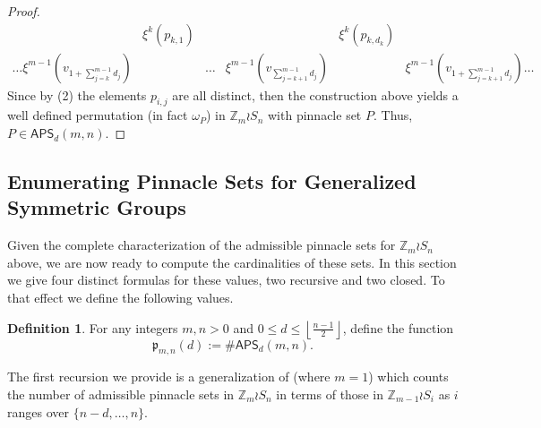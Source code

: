 \documentclass[12pt,reqno]{amsart}
\numberwithin{equation}{section}
\theoremstyle{plain}
\theoremstyle{definition}
\newtheorem{definition}[theorem]{Definition}
\theoremstyle{remark}
\newcommand{\Z}{\mathbb{Z}}
\newcommand{\p}{\mathfrak{p}}
\newcommand\APS{\mathsf{APS}}
\newcommand{\floor}[1]{\left\lfloor#1\right\rfloor}
\begin{document}
\begin{proof}
\[
\begin{matrix}&\xi^{k}(p_{k,1})&&&\xi^{k}(p_{k,d_{k}})
\\
\dots \xi^{m-1}(v_{1+\sum_{j=k}^{m-1} d_j})&& \dots & \xi^{m-1}(v_{\sum_{j=k+1}^{m-1} d_j})&& \xi^{m-1}(v_{1+\sum_{j=k+1}^{m-1} d_j})\dots 
\end{matrix}
\]
Since by (2) the elements $p_{i,j}$ are all distinct, then the construction above yields a well defined permutation (in fact $\omega_P$) in $\Z_m \wr S_n$ with pinnacle set $P$. Thus, $P \in \APS_d(m,n)$.

\end{proof}

\subsection{Enumerating Pinnacle Sets for Generalized Symmetric Groups}\label{subsec:enumeration}

Given the complete characterization of the admissible pinnacle sets for $\Z_m \wr S_n$ above, we are now ready to compute the cardinalities of these sets. In this section we give four distinct formulas for these values, two recursive and two closed. To that effect we define the following values.

\begin{definition}
For any integers $m,n>0$ and $0 \leq d \leq \floor{\frac{n-1}{2}}$, define the function \[\p_{m,n}(d):=\#\APS_d(m,n).\] 
\end{definition}

The first recursion we provide is a generalization of \cite[Proposition 3.11]{PinSignedPermutations} (where $m=1$) which counts the number of admissible pinnacle sets in $\Z_m\wr S_n$ in terms of those in $\Z_{m-1} \wr S_i$ as $i$ ranges over $\{n-d,\dots,n\}$.
\end{document}
